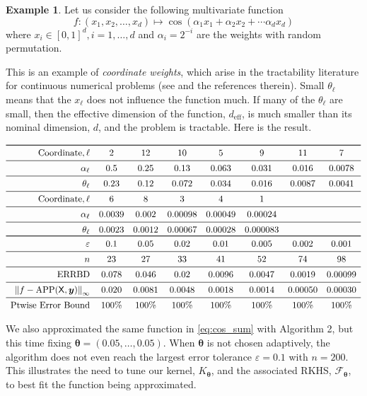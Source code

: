 \documentclass[]{mcom-l}
\theoremstyle{plain}
\theoremstyle{definition}
\newtheorem{example}{Example}
\DeclareMathOperator{\errBd}{ERRBD}
\DeclareMathOperator{\APP}{APP}
\newcommand{\mX}{\mathsf{X}}
\newcommand{\by}{{\boldsymbol{y}}}
\newcommand{\btheta}{{\boldsymbol{\theta}}}
\newcommand{\calf}{{\mathcal{F}}}
\newcommand{\norm}[2][{}]{\ensuremath{\left \lVert #2 \right \rVert}_{#1}}
\begin{document}
\begin{example}
\label{ex:ChengDufun}
Let us consider the following multivariate function
	\begin{equation}\label{eq:cos_sum}
	f:(x_1,x_2,\ldots,x_d) \mapsto 
 \cos(\alpha_1 x_1 + \alpha_2 x_2 +
 \cdots \alpha_d x_d)
	\end{equation}
	where $x_i \in [0,1]^d, i=1,\ldots,d$ and $\alpha_i =2^{-i}$ are the weights with random permutation. 
	
This is an example of \emph{coordinate weights}, which arise in the tractability literature for continuous numerical problems (see \cite{DicEtal14a,NovWoz08a, NovWoz10a, NovWoz12a} and the references therein).  Small $\theta_\ell$ means that the $x_\ell$ does not influence the function much.  If many of the $\theta_\ell$ are small, then the effective dimension of the function, $d_\text{eff}$, is much smaller than its nominal dimension, $d$, and the problem is tractable. Here is the result.
 
\begin{table}

\[ 
 \begin{array}{rccccccc} 
\toprule
\text{Coordinate}, \ell & 2 & 12 & 10 & 5 & 9 & 11 & 7 \\ \midrule 
\alpha_\ell & 0.5  & 0.25  & 0.13  & 0.063  & 0.031  & 0.016  & 0.0078  \\ \midrule 
\theta_\ell & 0.23  & 0.12  & 0.072  & 0.034  & 0.016  & 0.0087  & 0.0041  \\ \midrule 
\text{Coordinate}, \ell & 6  & 8  & 3  & 4  & 1  \\ \midrule 
\alpha_\ell & 0.0039  & 0.002  & 0.00098  & 0.00049  & 0.00024  \\ \midrule 
\theta_\ell & 0.0023  & 0.0012  & 0.00067  & 0.00028  & 0.000083   \\ \toprule 
\varepsilon & 0.1 & 0.05 & 0.02 & 0.01 & 0.005 & 0.002 & 0.001 \\ \midrule 
n &  23 &  27 &  33 &  41 &  52 &  74 &  98 \\ \midrule 
\errBd  & 0.078 & 0.046 & 0.02 & 0.0096 & 0.0047 & 0.0019 & 0.00099 \\ \midrule 
\norm[\infty]{f - \APP(\mX,\by)} & 0.020 & 0.0081 & 0.0048 & 0.0018 & 0.0014 & 0.00050 & 0.00030  \\ \midrule 
\text{Ptwise Error Bound} & 100\% & 100\% & 100\% & 100\% & 100\% & 100\% & 100\% 
\end{array} 
 \]
\end{table}

We also approximated the same function in \eqref{eq:cos_sum} with Algorithm 2, but this time fixing $\btheta = (0.05, \ldots, 0.05)$. When $\btheta$ is not chosen adaptively, the algorithm does not even reach the largest error tolerance $\varepsilon = 0.1$ with $n = 200$. This illustrates the need to tune our kernel, $K_\btheta$, and the associated RKHS, $\calf_\btheta$, to best fit the function being approximated.

\end{example}
\end{document}
